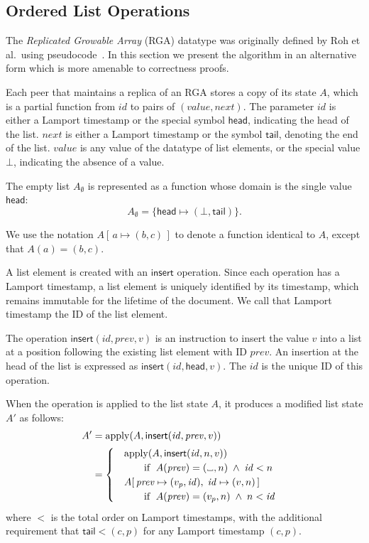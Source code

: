 \documentclass[a4paper,twocolumn,10pt]{article}
\newcommand\placeholder{%
  \makebox[0.7em]{%
    \kern.07em
    \vrule height.3ex
    \hrulefill
    \vrule height.3ex
    \kern.07em
  }%
}
\begin{document}
\subsection{Ordered List Operations}

The \emph{Replicated Growable Array} (RGA) datatype was originally defined by Roh et al.\ using pseudocode~\cite{Roh:2011dw}. In this section we present the algorithm in an alternative form which is more amenable to correctness proofs.

Each peer that maintains a replica of an RGA stores a copy of its state $A$, which is a partial function from $\mathit{id}$ to pairs of $(\mathit{value}, \mathit{next})$. The parameter $\mathit{id}$ is either a Lamport timestamp or the special symbol $\mathsf{head}$, indicating the head of the list. $\mathit{next}$ is either a Lamport timestamp or the symbol $\mathsf{tail}$, denoting the end of the list. $\mathit{value}$ is any value of the datatype of list elements, or the special value $\bot$, indicating the absence of a value.

The empty list $A_\emptyset$ is represented as a function whose domain is the single value $\mathsf{head}$:
$$ A_\emptyset = \{\mathsf{head} \mapsto (\bot, \mathsf{tail})\}. $$

We use the notation $A[\,a \mapsto (b, c)\,]$ to denote a function identical to $A$, except that $A(a)=(b,c)$.

A list element is created with an $\mathsf{insert}$ operation. Since each operation has a Lamport timestamp, a list element is uniquely identified by its timestamp, which remains immutable for the lifetime of the document. We call that Lamport timestamp the ID of the list element.

The operation $\mathsf{insert}(\mathit{id}, \mathit{prev}, v)$ is an instruction to insert the value $v$ into a list at a position following the existing list element with ID $\mathit{prev}$. An insertion at the head of the list is expressed as $\mathsf{insert}(\mathit{id}, \mathsf{head}, v)$. The $\mathit{id}$ is the unique ID of this operation.

When the operation is applied to the list state $A$, it produces a modified list state $A'$ as follows:
\begin{align*}
A' &= \mathrm{apply}(A, \mathsf{insert}(\mathit{id}, \mathit{prev}, v)) \\ &=
\begin{cases}
\quad \mathrm{apply}(A, \mathsf{insert}(\mathit{id}, n, v)) \\
    \qquad\quad\text{if }\; A(\mathit{prev}) = (\placeholder, n) \;\wedge\; \mathit{id} < n \\
\quad A[\,\mathit{prev} \mapsto (v_p, \mathit{id}),\; \mathit{id} \mapsto (v, n)\,] \\
    \qquad\quad\text{if }\; A(\mathit{prev}) = (v_p, n) \;\wedge\; n < \mathit{id}
\end{cases}
\end{align*}
where $<$ is the total order on Lamport timestamps, with the additional requirement that $\mathsf{tail} < (c, p)$ for any Lamport timestamp $(c, p)$.
\end{document}
